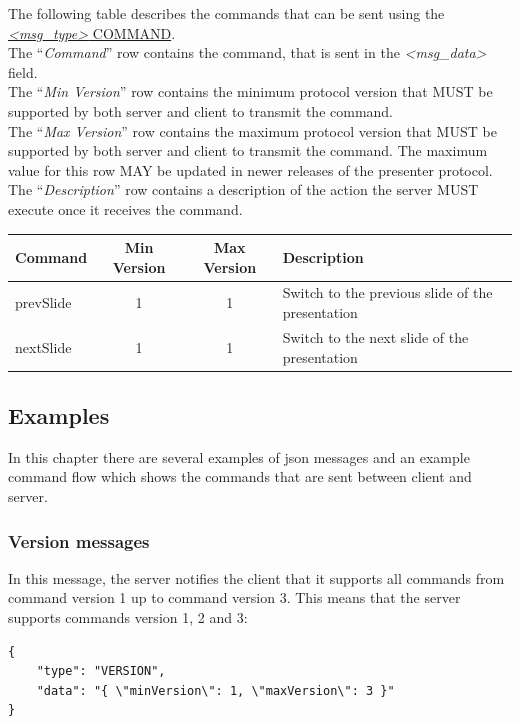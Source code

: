 \documentclass[]{article}
\begin{document}
The following table describes the commands that can be sent using the \hyperref[msg_command]{\emph{\textless{}msg\_type\textgreater{}} COMMAND}.\\
The ``\emph{Command}'' row contains the command, that is sent in the \emph{\textless{}msg\_data\textgreater{}} field.\\ The ``\emph{Min Version}'' row contains the minimum protocol version
that MUST be supported by both server and client to transmit the command.\\
The ``\emph{Max Version}'' row contains the maximum protocol version that MUST be supported by both server and client to transmit the command. The maximum value for this row MAY be updated in newer releases of the presenter protocol.\\
The ``\emph{Description}'' row contains a description of the action the server MUST execute once it receives the command.

\begin{longtable}{lccp{5cm}}
\toprule
Command & Min Version & Max Version & Description\\
\midrule
\endhead
prevSlide & 1 & 1 & Switch to the previous slide of the presentation\\
nextSlide & 1 & 1 & Switch to the next slide of the presentation\\
\bottomrule
\end{longtable}

\subsection{Examples}

In this chapter there are several examples of json messages and an example command flow which shows the commands that are sent between client and server.

\subsubsection{Version messages}

In this message, the server notifies the client that it supports all commands from command version 1 up to command version 3. This means that the server supports commands version 1, 2 and 3:

\begin{verbatim}
{
    "type": "VERSION",
    "data": "{ \"minVersion\": 1, \"maxVersion\": 3 }"
}
\end{verbatim}
\end{document}
